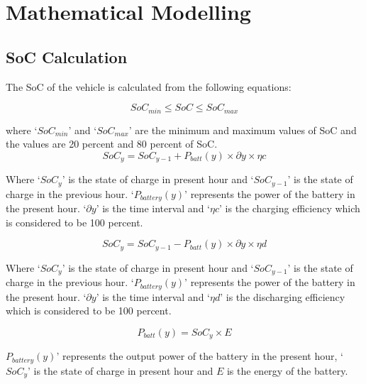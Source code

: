 	\chapter{Mathematical Modelling}
	\label{chap:mathmodel}
	
	\section{SoC Calculation}
	
	
		
	The SoC of the vehicle is calculated from the following equations:
	

			\begin{equation}
		                             SoC_{min} \leq SoC \leq SoC_{max}\label{eq:socminmax}
		    \end{equation}
	    
where `$SoC_{min}$'  and `$SoC_{max}$' are the minimum and maximum values of SoC and the values are 20 percent and 80 percent of SoC.
		    \begin{equation}                         
		               SoC_{y} = SoC_{y-1} + P_{batt}(y) \times \partial y \times \eta c
			\end{equation}
		
		Where `$SoC_{y}$' is the state of charge in present hour and `$SoC_{y-1}$' is the state of charge in the previous hour. `$P_{battery}(y)$' represents the power of the battery in the present hour. `$\partial y$' is the time interval and `$\eta c$' is the charging efficiency which is considered to be 100 percent. 
		
		    \begin{equation}             
		               SoC_{y} = SoC_{y-1} - P_{batt}(y) \times \partial y \times \eta d
			\end{equation}
		
		Where `$SoC_{y}$' is the state of charge in present hour and `$SoC_{y-1}$' is the state of charge in the previous hour. `$P_{battery}(y)$' represents the power of the battery in the present hour. `$\partial y$' is the time interval and `$\eta d$' is the discharging efficiency which is considered to be 100 percent.
		
		    \begin{equation}             
		               P_{batt}(y) = SoC_{y} \times E
		    \end{equation}
	    
	    $P_{battery}(y)$' represents the output power of the battery in the present hour, `$SoC_{y}$' is the state of charge in present hour and $E$ is the energy of the battery. 
		 
